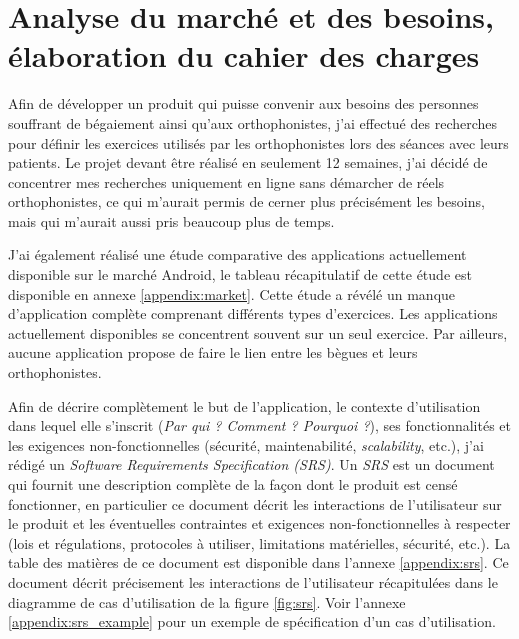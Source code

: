 \section{Analyse du marché et des besoins, élaboration du cahier des charges}
Afin de développer un produit qui puisse convenir aux besoins des personnes souffrant de bégaiement ainsi qu'aux orthophonistes, j'ai effectué des recherches pour définir les exercices utilisés par les orthophonistes lors des séances avec leurs patients. Le projet devant être réalisé en seulement 12 semaines, j'ai décidé de concentrer mes recherches uniquement en ligne sans démarcher de réels orthophonistes, ce qui m'aurait permis de cerner plus précisément les besoins, mais qui m'aurait aussi pris beaucoup plus de temps.

J'ai également réalisé une étude comparative des applications actuellement disponible sur le marché Android, le tableau récapitulatif de cette étude est disponible en annexe \ref{appendix:market}. Cette étude a révélé un manque d'application complète comprenant différents types d'exercices. Les applications actuellement disponibles se concentrent souvent sur un seul exercice. Par ailleurs, aucune application propose de faire le lien entre les bègues et leurs orthophonistes.

Afin de décrire complètement le but de l'application, le contexte d'utilisation dans lequel elle s'inscrit (\textit{Par qui ? Comment ? Pourquoi ?}), ses fonctionnalités et les exigences non-fonctionnelles (sécurité, maintenabilité, \textit{scalability}, etc.), j'ai rédigé un \textit{Software Requirements Specification (SRS)}. Un \textit{SRS} est un document qui fournit une description complète de la façon dont le produit est censé fonctionner, en particulier ce document décrit les interactions de l'utilisateur sur le produit et les éventuelles contraintes et exigences non-fonctionnelles à respecter (lois et régulations, protocoles à utiliser, limitations matérielles, sécurité, etc.). La table des matières de ce document est disponible dans l'annexe \ref{appendix:srs}. Ce document décrit précisement les interactions de l'utilisateur récapitulées dans le diagramme de cas d'utilisation de la figure \ref{fig:srs}. Voir l'annexe \ref{appendix:srs_example} pour un exemple de spécification d'un cas d'utilisation.

